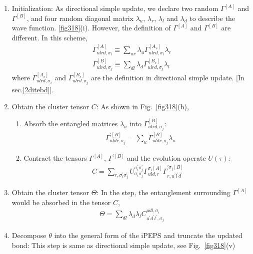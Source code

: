 \begin{enumerate}
	\item Initialization: As directional simple update, we declare two random $\Gamma^{[A]}$ and $\Gamma^{[B]}$, and four random diagonal matrix $\lambda_{u}$, $\lambda_{r}$, $\lambda_{l}$ and $\lambda_{d}$ to describe the wave function. \ref{fig318}(i). However, the definition of $\Gamma^{[A]}$ and $\Gamma^{[B]}$ are different. In this scheme,
		\begin{align}
			\Gamma^{[A]}_{ulrd,\sigma_i} \equiv \sum_{ur}{\lambda_{u} \Gamma^{[A_s]}_{ulrd,\sigma_i} \lambda_{r}} \\
			\Gamma^{[B]}_{ulrd,\sigma_j} \equiv \sum_{dl}{\lambda_{d} \Gamma^{[B_s]}_{ulrd,\sigma_j} \lambda_{l}}
		\end{align}
		where $\Gamma^{[A_s]}_{ulrd,\sigma_i}$ and $\Gamma^{[B_s]}_{ulrd,\sigma_j}$ are the definition in directional simple update. [In sec.\ref{2ditebd}].
	\item Obtain the cluster tensor $C$: As shown in Fig.~\ref{fig318}(b),
			\begin{enumerate}
				\item Absorb the entangled matrices $\lambda_{u}$ into  $\Gamma^{[B]}_{ulrd,\sigma_j}$:
					\begin{align}
						&\Gamma^{\prime [B]}_{uldr, \sigma_j} = \sum_{u}{\Gamma^{[B]}_{uldr,\sigma_j} \lambda_{u}}
					\end{align}
				\item Contract the tensors $\Gamma^{[A]}$, $\Gamma^{\prime [B]}$ and the evolution operate $U(\tau)$: 
					\begin{align}
						C = \sum_{r,\sigma_i^{\prime}\sigma_j^{\prime}}{U^{\sigma_i^{\prime}\sigma_j^{\prime}}_{\sigma_i\sigma_j} \Gamma^{\sigma_i [A]}_{uld,r} \Gamma^{\prime \sigma_j[B]}_{r,u^{\prime} l^{\prime} d^{\prime}}}
					\end{align}
			\end{enumerate}
		\item Obtain the cluster tensor $\Theta$: In the step, the entanglement surrounding $\Gamma^{[A]}$ would be absorbed in the tensor $C$,
			\begin{align}
				\Theta = \sum_{dl}{\lambda_{d} \lambda_{l} C^{udl,\sigma_i}_{u^{\prime}d^{\prime}l^{\prime},\sigma_j}}
			\end{align}
		\item Decompose $\theta$ into the general form of the iPEPS and truncate the updated bond: This step is same as directional simple update, see Fig.~\ref{fig318}(v)

\end{enumerate}
